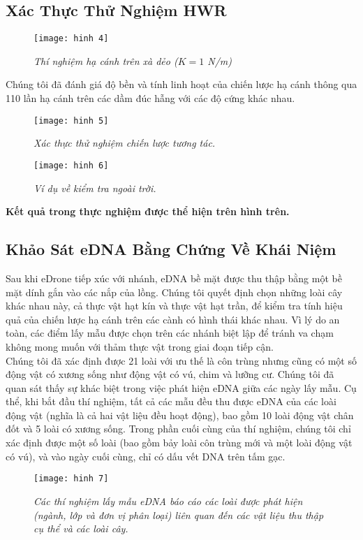 \documentclass[12pt,a4paper]{article}
\begin{document}
\subsection{Xác Thực Thử Nghiệm HWR}
\begin{figure}[ht!]
    \centering
    \texttt{[image: hinh 4]}
    \caption{\textit{Thí nghiệm hạ cánh trên xà dẻo ($K = 1$  N/m)}}
    \label{fig4}
\end{figure}
Chúng tôi đã đánh giá độ bền và tính linh hoạt của chiến lược hạ cánh thông qua 110 lần hạ cánh trên các dầm đúc hẫng với các độ cứng khác nhau.
\newpage
\begin{figure}[ht!]
    \centering
    \texttt{[image: hinh 5]}
    \caption{\textit{Xác thực thử nghiệm chiến lược tương tác.}}
    \label{fig5}
\end{figure}
\begin{figure}[ht!]
    \centering
    \texttt{[image: hinh 6]}
    \caption{\textit{Ví dụ về kiểm tra ngoài trời.}}
    \label{fig6}
\end{figure}
\begin{center}
    \textbf{Kết quả trong thực nghiệm được thể hiện trên hình trên.}
\end{center}
\newpage
\subsection{Khảo Sát eDNA Bằng Chứng Về Khái Niệm}
Sau khi eDrone tiếp xúc với nhánh, eDNA bề mặt được thu thập bằng một bề mặt dính gắn vào các nắp của lồng. Chúng tôi quyết định chọn những loài cây khác nhau này, cả thực vật hạt kín và thực vật hạt trần, để kiểm tra tính hiệu quả của chiến lược hạ cánh trên các cành có hình thái khác nhau. Vì lý do an toàn, các điểm lấy mẫu được chọn trên các nhánh biệt lập để tránh va chạm không mong muốn với thảm thực vật trong giai đoạn tiếp cận.\\
\linebreak
Chúng tôi đã xác định được 21 loài với ưu thế là côn trùng nhưng cũng có một số động vật có xương sống như động vật có vú, chim và lưỡng cư. Chúng tôi đã quan sát thấy sự khác biệt trong việc phát hiện eDNA giữa các ngày lấy mẫu. Cụ thể, khi bắt đầu thí nghiệm, tất cả các mẫu đều thu được eDNA của các loài động vật (nghĩa là cả hai vật liệu đều hoạt động), bao gồm 10 loài động vật chân đốt và 5 loài có xương sống. Trong phần cuối cùng của thí nghiệm, chúng tôi chỉ xác định được một số loài (bao gồm bảy loài côn trùng mới và một loài động vật có vú), và vào ngày cuối cùng, chỉ có dấu vết DNA trên tấm gạc.\\
\begin{figure}[ht!]
    \centering
    \texttt{[image: hinh 7]}
    \caption{\textit{Các thí nghiệm lấy mẫu eDNA báo cáo các loài được phát hiện (ngành, lớp và đơn vị phân loại) liên quan đến các vật liệu thu thập cụ thể và các loài cây.}}
    \label{fig7}
\end{figure}
\newpage
\end{document}
